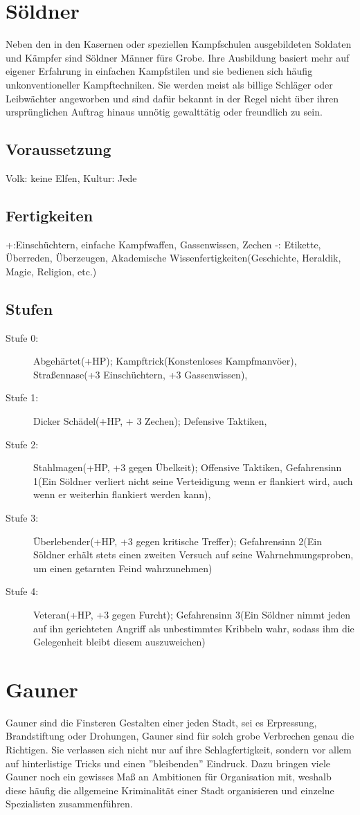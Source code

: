 \documentclass[a4paper,12pt,oneside]{book}
\begin{document}
\section{Söldner}
Neben den in den Kasernen oder speziellen Kampfschulen ausgebildeten Soldaten und Kämpfer sind Söldner Männer fürs Grobe. Ihre Ausbildung basiert mehr auf eigener Erfahrung in einfachen Kampfstilen und sie bedienen sich häufig unkonventioneller Kampftechniken. Sie werden meist als billige Schläger oder Leibwächter angeworben und sind dafür bekannt in der Regel nicht über ihren ursprünglichen Auftrag hinaus unnötig gewalttätig oder freundlich zu sein.
\subsection{Voraussetzung}
Volk: keine Elfen, Kultur: Jede
\subsection{Fertigkeiten}
+:Einschüchtern, einfache Kampfwaffen, Gassenwissen, Zechen
-: Etikette, Überreden, Überzeugen, Akademische Wissenfertigkeiten(Geschichte, Heraldik, Magie, Religion, etc.)
\subsection{Stufen}
\begin{description}
\item[Stufe 0:] Abgehärtet(+HP); Kampftrick(Konstenloses Kampfmanvöer), Straßennase(+3 Einschüchtern, +3 Gassenwissen), 
\item[Stufe 1:] Dicker Schädel(+HP, + 3 Zechen); Defensive Taktiken,
\item[Stufe 2:] Stahlmagen(+HP, +3 gegen Übelkeit); Offensive Taktiken, Gefahrensinn 1(Ein Söldner verliert nicht seine Verteidigung wenn er flankiert wird, auch wenn er weiterhin flankiert werden kann), 
\item[Stufe 3:] Überlebender(+HP, +3 gegen kritische Treffer); Gefahrensinn 2(Ein Söldner erhält stets einen zweiten Versuch auf seine Wahrnehmungsproben, um einen getarnten Feind wahrzunehmen)
\item[Stufe 4:] Veteran(+HP, +3 gegen Furcht); Gefahrensinn 3(Ein Söldner nimmt jeden auf ihn gerichteten Angriff als unbestimmtes Kribbeln wahr, sodass ihm die Gelegenheit bleibt diesem auszuweichen)
\end{description}
\section{Gauner}
Gauner sind die Finsteren Gestalten einer jeden Stadt, sei es Erpressung, Brandstiftung oder Drohungen, Gauner sind für solch grobe Verbrechen genau die Richtigen. Sie verlassen sich nicht nur auf ihre Schlagfertigkeit, sondern vor allem auf hinterlistige Tricks und einen ''bleibenden'' Eindruck. Dazu bringen viele Gauner noch ein gewisses Maß an Ambitionen für Organisation mit, weshalb diese häufig die allgemeine Kriminalität einer Stadt organisieren und einzelne Spezialisten zusammenführen.
\end{document}
